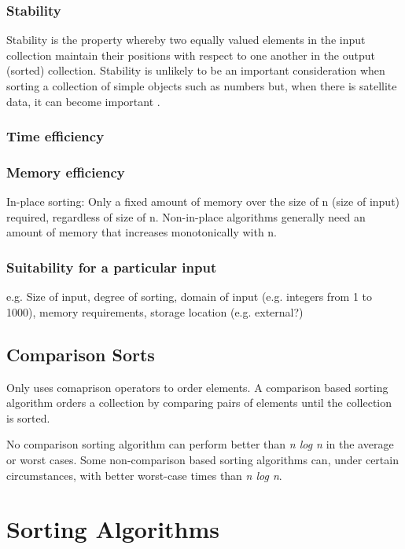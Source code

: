\documentclass[12pt, a4paper]{article}
\begin{document}
\subsubsection{Stability}

Stability is the property whereby two equally valued elements in the input collection maintain their positions with respect to one another in the output (sorted) collection. Stability is unlikely to be an important consideration when sorting a collection of simple objects such as numbers but, when there is satellite data, it can become important \autocite{cormen01}.

\subsubsection{Time efficiency}

\subsubsection{Memory efficiency}
In-place sorting: Only a fixed amount of memory over the size of n (size of input) required, regardless of size of n. Non-in-place algorithms generally need an amount of memory that increases monotonically with n.

\subsubsection{Suitability for a particular input}

e.g. Size of input, degree of sorting, domain of input (e.g. integers from 1 to 1000), memory requirements, storage location (e.g. external?)

\subsection{Comparison Sorts}

Only uses comaprison operators to order elements. A comparison based sorting algorithm orders a collection by comparing pairs of elements until the collection is sorted.

No comparison sorting algorithm can perform better than \emph{n log n} in the average or worst cases. Some non-comparison based sorting algorithms can, under certain circumstances, with better worst-case times than \emph{n log n}.

\section{Sorting Algorithms}
\end{document}
